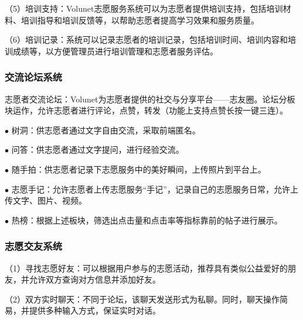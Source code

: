 （5）培训支持：Volunet志愿服务系统可以为志愿者提供培训支持，包括培训材料、培训指导和培训反馈等，以帮助志愿者提高学习效果和服务质量。

（6）培训记录：系统可以记录志愿者的培训记录，包括培训时间、培训内容和培训成绩等，以方便管理员进行培训管理和志愿者服务评估。


\subsubsection{交流论坛系统}

志愿者交流论坛：Volunet为志愿者提供的社交与分享平台——志友圈。论坛分板块运作，允许志愿者进行评论，点赞，转发（功能上支持点赞长按一键三连）。

$\bullet$ 树洞：供志愿者通过文字自由交流，采取前端匿名。

$\bullet$ 问答：供志愿者通过文字提问，进行经验交流。

$\bullet$ 随手拍：供志愿者记录下志愿服务中的美好瞬间，上传照片到平台上。

$\bullet$ 志愿手记：允许志愿者上传志愿服务“手记”，记录自己的志愿服务日常，允许上传文字、图片、视频。

$\bullet$ 热榜：根据上述板块，筛选出点击量和点击率等指标靠前的帖子进行展示。

\subsubsection{志愿交友系统}
（1）寻找志愿好友：可以根据用户参与的志愿活动，推荐具有类似公益爱好的朋友，并允许双方查询对方信息并添加好友。

（2）双方实时聊天：不同于论坛，该聊天发送形式为私聊。同时，聊天操作简易，并提供多种输入方式，保证实时对话。







